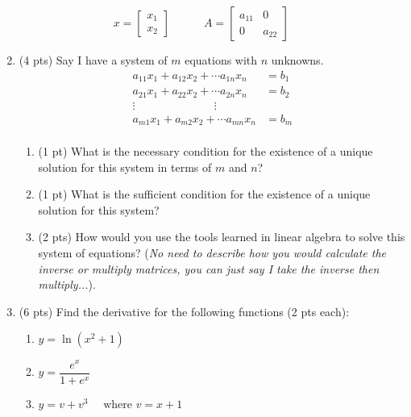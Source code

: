 \documentclass{./../../../Latex/tests}
\begin{document}
\begin{enumerate}
$$
x = \begin{bmatrix}
x_1 \\ x_2
\end{bmatrix} \quad \quad \quad
A = \begin{bmatrix}
a_{11} & 0 \\ 0 & a_{22}
\end{bmatrix} \quad \quad
$$

\newpage
\item (4 pts) Say I have a system of $m$ equations with $n$ unknowns. 
\begin{align*}
	a_{11} x_1 + a_{12} x_2 + \cdots a_{1n} x_n &= b_1 \\
	a_{21} x_1 + a_{22} x_2 + \cdots a_{2n} x_n &= b_2 \\
	\vdots \quad \quad \quad \quad \quad \quad \quad \vdots \\
	a_{m1} x_1 + a_{m2} x_2 + \cdots a_{mn} x_n &= b_m \\
\end{align*}
\begin{enumerate}
	\item (1 pt) What is the necessary condition for the existence of a unique solution for this system in terms of $m$ and $n$? \\ \vspace{2.5cm}
	\item (1 pt) What is the sufficient condition for the existence of a unique solution for this system? \\ \vspace{3.5cm}
	\item (2 pts) How would you use the tools learned in linear algebra to solve this system of equations? (\textit{No need to describe how you would calculate the inverse or multiply matrices, you can just say I take the inverse then multiply...}).
\end{enumerate}

\newpage
\item (6 pts) Find the derivative for the following functions (2 pts each): \\
\begin{enumerate}
\item $y=\ln(x^2+1)$ \\ \vspace{4cm}
\item $y=\dfrac{e^x}{1+e^x}$ \\ \vspace{5cm}
\item $y=v+v^3 \quad \text{ where } v=x+1 $ \\ \vspace{3cm}
\end{enumerate}


\end{enumerate}
\end{document}
